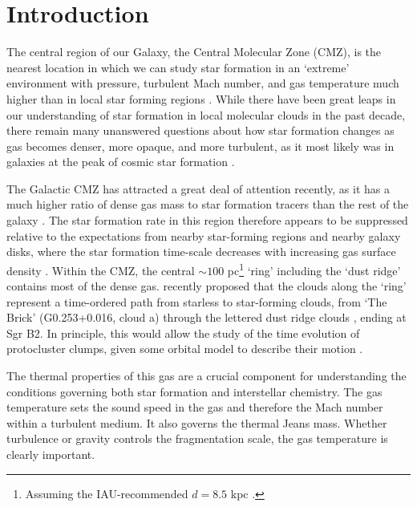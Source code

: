 
\maketitle


\section{Introduction}
The central region of our Galaxy, the Central Molecular Zone (CMZ), is the
nearest location in which we can study star formation in an `extreme'
environment with pressure, turbulent Mach number, and gas temperature much
higher than in local star forming regions \citep{Morris1996a}.  While there
have been great leaps in our understanding of star formation in local
molecular clouds in the past decade, there remain many unanswered questions
about how star formation changes as gas becomes denser, more opaque, and more
turbulent, as it most likely was in galaxies at the peak of cosmic star
formation \citep{Kruijssen2013a}.


The Galactic
CMZ has attracted
a great deal of attention recently, as it has a much higher ratio of dense gas
mass to star formation tracers than the rest of the galaxy
\citep{Longmore2013a,Longmore2012b,Longmore2013b,Kruijssen2013a,Yusef-Zadeh2009a,Immer2012a}.
The star formation rate in this region therefore appears to be suppressed
relative to the expectations from nearby star-forming regions and nearby galaxy
disks, where the star formation time-scale decreases with increasing gas
surface density
\citep{Kennicutt1998a,Kennicutt2012a,Leroy2013a,Heiderman2010a}.
Within the CMZ,
the central $\sim100$ pc\footnote{Assuming the IAU-recommended $d=8.5$ kpc
\citep{Ghez2008a,Gillessen2009b,Reid2009a,Gillessen2013b}.} `ring' including
the  `dust ridge' \citep{Lis1991a,Sofue1995a,Molinari2011a} contains most of the
dense gas.
\citet{Longmore2013a} recently proposed that the clouds along the `ring'
\citep[which is more accurately described as a `stream';][]{Kruijssen2015a}
represent a time-ordered path from starless to star-forming clouds, from `The
Brick' (G0.253+0.016, cloud a) through the lettered dust ridge clouds
\citep[clouds b,c,d,e,f][]{Lis1999a}, ending at Sgr B2.  In principle, this
would allow the study of the time evolution of protocluster clumps, given some
orbital model to describe their motion \citep{Kruijssen2015a}.

The thermal properties of this gas are a crucial component for understanding
the conditions governing both star formation and interstellar chemistry.  The
gas temperature sets the sound speed in the gas and therefore the Mach number
within a turbulent medium.  It also governs the thermal Jeans mass.  Whether
turbulence or gravity controls the fragmentation scale, the gas temperature is
clearly important.  

